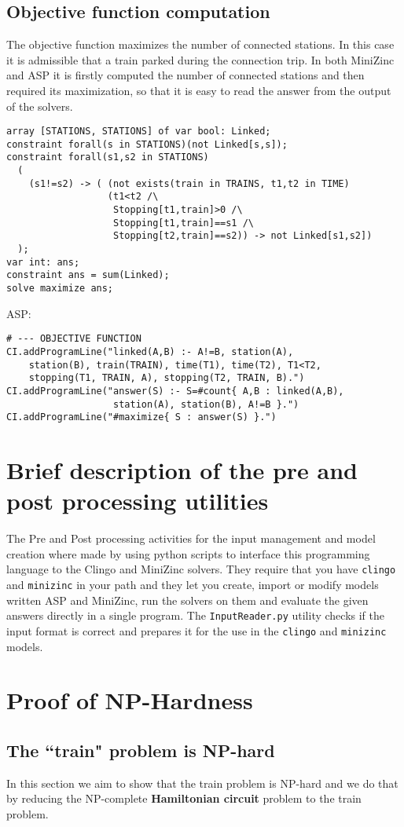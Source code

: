 \documentclass[11pt]{article}
\begin{document}
\subsection{Objective function computation}
The objective function maximizes the number of connected stations. In this 
case it is admissible that a train parked during the connection trip. 
In both MiniZinc and ASP it is firstly computed the number of 
connected stations and then required its maximization, so that it is
easy to read the answer from the output of the solvers. 
\begin{verbatim}
array [STATIONS, STATIONS] of var bool: Linked;
constraint forall(s in STATIONS)(not Linked[s,s]);
constraint forall(s1,s2 in STATIONS)
  (
    (s1!=s2) -> ( (not exists(train in TRAINS, t1,t2 in TIME)
                  (t1<t2 /\
                   Stopping[t1,train]>0 /\
                   Stopping[t1,train]==s1 /\ 
                   Stopping[t2,train]==s2)) -> not Linked[s1,s2])
  );
var int: ans;
constraint ans = sum(Linked);
solve maximize ans;
\end{verbatim}
ASP:
\begin{verbatim}
# --- OBJECTIVE FUNCTION
CI.addProgramLine("linked(A,B) :- A!=B, station(A),
    station(B), train(TRAIN), time(T1), time(T2), T1<T2,
    stopping(T1, TRAIN, A), stopping(T2, TRAIN, B).")
CI.addProgramLine("answer(S) :- S=#count{ A,B : linked(A,B),
                   station(A), station(B), A!=B }.")
CI.addProgramLine("#maximize{ S : answer(S) }.")
\end{verbatim}
\section{Brief description of the pre and post processing utilities}
The Pre and Post processing activities for the input management and model creation where made by using python scripts to interface this
programming language to the Clingo and MiniZinc solvers. They require that you have \verb+clingo+ and \verb+minizinc+ in your path
and they let you create, import or modify models written ASP and MiniZinc, run the solvers on them and evaluate the given answers
directly in a single program. The \verb+InputReader.py+ utility checks if the input format is correct and prepares it for the use in the 
\verb+clingo+ and \verb+minizinc+ models.
\section{Proof of NP-Hardness}
\subsection{The ``train" problem is NP-hard}
In this section we aim to show that the train problem is NP-hard and we do that by reducing the NP-complete \textbf{Hamiltonian circuit} problem to the train problem.
\end{document}
